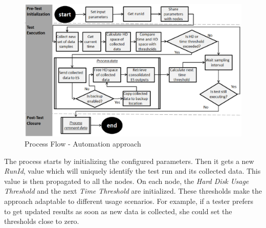 \documentclass[runningheads,a4paper]{llncs}
\begin{document}

\begin{figure}[!h]
\centering
\includegraphics[totalheight=.35\textheight,width=1.0\textwidth]{ApproachDiagram}
\caption{Process Flow - Automation approach}
\label{fig_ApproachDiagram}
\end{figure}

The process starts
by initializing the
configured parameters. Then it gets a new \emph{RunId}, value which will
uniquely identify the test run and its collected data. This value is then
propagated to all the nodes. On each node, the \emph{Hard Disk Usage Threshold} and  
the next \emph{Time Threshold} are initialized. These
thresholds make the approach adaptable to different usage scenarios. For
example, if a tester prefers to get updated results as soon as new data is
collected, she could set the thresholds close to zero.

\end{document}
